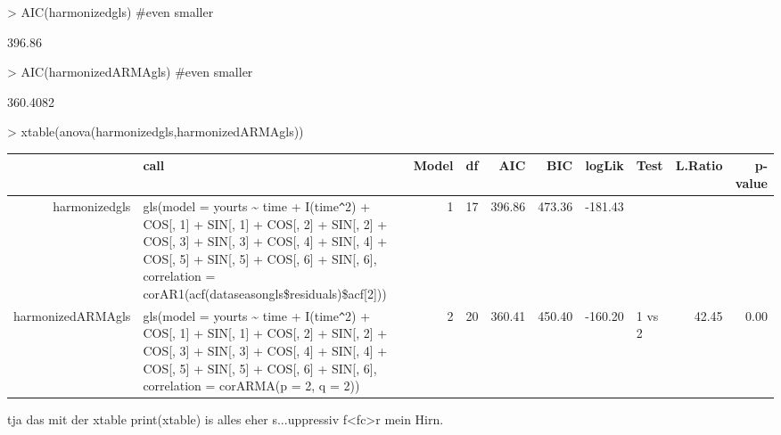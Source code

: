 \documentclass[11pt, a4paper]{article} %
\begin{document}
\begin{Schunk}
\begin{Sinput}
> AIC(harmonizedgls) #even smaller 
\end{Sinput}
\begin{Soutput}
[1] 396.86
\end{Soutput}
\begin{Sinput}
> AIC(harmonizedARMAgls) #even smaller 
\end{Sinput}
\begin{Soutput}
[1] 360.4082
\end{Soutput}
\begin{Sinput}
> xtable(anova(harmonizedgls,harmonizedARMAgls))
\end{Sinput}
\begin{Soutput}
\begin{table}[ht]
\centering
\begin{tabular}{rlrrrrrlrr}
  \hline
 & call & Model & df & AIC & BIC & logLik & Test & L.Ratio & p-value \\ 
  \hline
harmonizedgls & gls(model = yourts \~{} time + I(time\verb|^|2) + COS[, 1] + SIN[, 1] +     COS[, 2] + SIN[, 2] + COS[, 3] + SIN[, 3] + COS[, 4] + SIN[,     4] + COS[, 5] + SIN[, 5] + COS[, 6] + SIN[, 6], correlation = corAR1(acf(dataseasongls\$residuals)\$acf[2])) &   1 &  17 & 396.86 & 473.36 & -181.43 &  &  &  \\ 
  harmonizedARMAgls & gls(model = yourts \~{} time + I(time\verb|^|2) + COS[, 1] + SIN[, 1] +     COS[, 2] + SIN[, 2] + COS[, 3] + SIN[, 3] + COS[, 4] + SIN[,     4] + COS[, 5] + SIN[, 5] + COS[, 6] + SIN[, 6], correlation = corARMA(p = 2,     q = 2)) &   2 &  20 & 360.41 & 450.40 & -160.20 & 1 vs 2 & 42.45 & 0.00 \\ 
   \hline
\end{tabular}
\end{table}
\end{Soutput}
\end{Schunk}
tja das mit der xtable print(xtable) is alles eher s...uppressiv f<fc>r mein Hirn. \\
\end{document}
